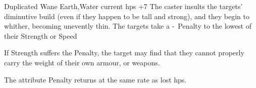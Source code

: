   {Duplicated}%
  {Wane}%
  {Earth,Water}%
  {current \glspl{hp} +7}%
  {The caster insults the targets' diminutive build (even if they happen to be tall and strong), and they begin to whither, becoming unevently thin.
    The targets take a -~Penalty to the lowest of their Strength or Speed}%
  {If Strength suffers the Penalty, the target may find that they cannot properly carry the weight of their own armour, or weapons.

    The \gls{attribute} Penalty returns at the same rate as lost \glspl{hp}.}

